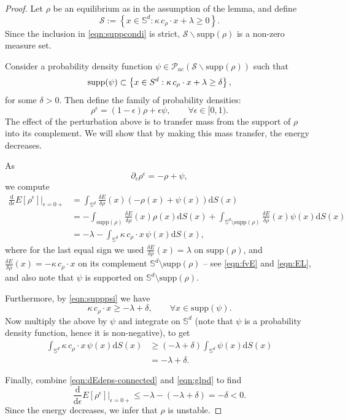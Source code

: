 \documentclass[11pt]{amsart}
\newcommand{\bbs}{\mathbb S}
\def\d{\mathrm{d}}
\newcommand{\dx}{\mathrm{d}S (x)}
\newcommand{\supp}{\mathrm{supp}(\rho)}
\newcommand{\dm}{d} %
\begin{document}
\begin{proof}
Let $\rho$ be an equilibrium as in the assumption of the lemma, and define
\[
\mathcal{S} := \left\{x \in \bbs^\dm:\kappa\, c_\rho\cdot x+\lambda\ge0\right\}.
\]
Since the inclusion in \eqref{eqn:suppcondi} is strict, $\mathcal{S}\backslash \supp$ is a non-zero measure set. 

Consider a probability density function $ \displaystyle \psi\in\mathcal{P}_{ac}(\mathcal{S}\backslash \supp)$ such that
\begin{align}\label{eqn:supppsi}
\mathrm{supp}(\psi)\subset \left\{x\in\mathbb \bbs^\dm:\kappa \, c_\rho\cdot x+\lambda\ge\delta\right\},
\end{align}
for some $\delta>0$. Then define the family of probability densities:
\[
\rho^\epsilon=(1-\epsilon)\rho+\epsilon \psi, \qquad\forall \epsilon\in[0, 1).
\]
The effect of the perturbation above is to transfer mass from the support of $\rho$ into its complement. We will show that by making this mass transfer, the energy decreases.

As
\[
\partial_\epsilon \rho^\epsilon=-\rho+\psi,
\]
we compute
\begin{equation}
\label{eqn:dEdeps-connected}
\begin{aligned}
\frac{\d}{\d\epsilon}E[\rho^\epsilon]\bigg|_{\epsilon=0+}&=\int_{\bbs^\dm}\frac{\delta E}{\delta\rho}(x) \left(-\rho(x)+\psi(x)\right)\dx\\[2pt]
&=-\int_{\supp}\frac{\delta E}{\delta\rho}(x)\rho(x)\dx+\int_{\bbs^\dm \setminus \supp }\frac{\delta E}{\delta\rho}(x)\psi(x)\dx\\[2pt]
&=-\lambda -\int_{\bbs^\dm}\kappa \, c_\rho\cdot x \, \psi(x)\dx,
\end{aligned}
\end{equation}
where for the last equal sign we used $\frac{\delta E}{\delta\rho}(x) = \lambda$ on $\supp$, and  $\frac{\delta E}{\delta\rho}(x) = - \kappa \, c_\rho\cdot x$ on its complement $\bbs^\dm \setminus \supp$ -- see \eqref{eqn:fvE} and \eqref{eqn:EL}, and also note that $\psi$ is supported on $\bbs^\dm \setminus \supp$. 

Furthermore, by \eqref{eqn:supppsi} we have
\begin{equation*}
\kappa \, c_\rho\cdot x\geq -\lambda+\delta, \qquad\forall x\in\mathrm{supp}(\psi).
\end{equation*}
Now multiply the above by $\psi$ and integrate on $\bbs^\dm$ (note that $\psi$ is a probability density function, hence it is non-negative), to get
\begin{equation}
\label{eqn:glpd}
\begin{aligned}
\int_{\bbs^\dm}\kappa \, c_\rho\cdot x \, \psi(x)\dx &\geq (-\lambda+\delta)\int_{\bbs^\dm}\psi(x)\dx\\
&=-\lambda+\delta.
\end{aligned}
\end{equation}

Finally, combine \eqref{eqn:dEdeps-connected} and \eqref{eqn:glpd} to find
\[
\frac{\d}{\d\epsilon}E[\rho^\epsilon]\bigg|_{\epsilon=0+}\leq -\lambda-(-\lambda+\delta)=-\delta<0.
\]
Since the energy decreases, we infer that $\rho$ is unstable.
\end{proof}
\end{document}
